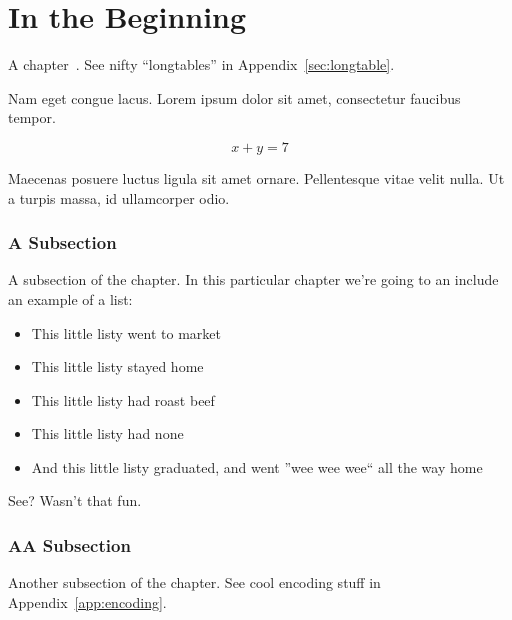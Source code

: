 \documentclass[letterpaper,12pt]{article}
\begin{document}

\bodymatter



\chapter{In the Beginning}
A chapter~\cite{ref:A,ref:B,ref:C}. See nifty ``longtables'' in Appendix~\ref{sec:longtable}.

Nam eget congue lacus. Lorem ipsum dolor sit amet, consectetur faucibus tempor.

\begin{equation}
x+y=7
\end{equation}

Maecenas posuere luctus ligula sit amet ornare. Pellentesque vitae velit nulla. Ut a turpis massa, id ullamcorper odio.

\subsection{A Subsection}%
A subsection of the chapter.  In this particular chapter we're going to an include an example of a list:
\begin{itemize}
	\item This little listy went to market
	\item This little listy stayed home
	\item This little listy had roast beef
	\item This little listy had none
	\item And this little listy graduated, and went ''wee wee wee`` all the way home
\end{itemize}
See? Wasn't that fun.

\subsection{AA Subsection}
Another subsection of the chapter.  See cool encoding stuff in Appendix~\ref{app:encoding}.
\end{document}
